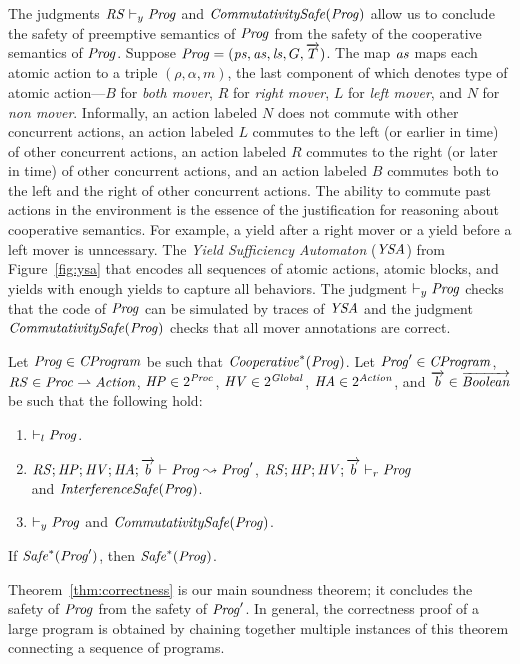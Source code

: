The judgments $\mathit{RS} \vdash_y \mathit{Prog}$ and $\mathit{CommutativitySafe}(\mathit{Prog})$
allow us to conclude the safety of preemptive semantics of $\mathit{Prog}$
from the safety of the cooperative semantics of $\mathit{Prog}$.
Suppose $\mathit{Prog} = (\mathit{ps}, \mathit{as}, \mathit{ls}, G, \overrightarrow{T})$.
The map $\mathit{as}$ maps each atomic action to a triple $(\rho, \alpha, m)$, the last component of which 
denotes type of atomic action---$B$ for {\em both mover}, $R$ for {\em right mover}, $L$ for {\em left mover},
and $N$ for {\em non mover}.
Informally, an action labeled $N$ does not commute with other concurrent actions,
an action labeled $L$ commutes to the left (or earlier in time) of other concurrent actions,
an action labeled $R$ commutes to the right (or later in time) of other concurrent actions,
and an action labeled $B$ commutes both to the left and the right of other concurrent actions.
The ability to commute past actions in the environment is the essence of the justification 
for reasoning about cooperative semantics.
For example, a yield after a right mover or a yield before a left mover is unncessary.
The {\em Yield Sufficiency Automaton\/} ($\mathit{YSA}$) from Figure~\ref{fig:ysa} that encodes 
all sequences of atomic actions, atomic blocks, and yields with enough yields to capture all behaviors.
The judgment $\vdash_y \mathit{Prog}$ checks that the code of $\mathit{Prog}$ can be simulated by traces of $\mathit{YSA}$
and the judgment $\mathit{CommutativitySafe}(\mathit{Prog})$ checks that all mover annotations are correct.

\begin{theorem}
\label{thm:correctness}
Let $\mathit{Prog} \in \mathit{CProgram}$ be such that $\mathit{Cooperative}^*(\mathit{Prog})$.
Let $\mathit{Prog}' \in \mathit{CProgram}$, $\mathit{RS} \in \mathit{Proc} \rightharpoonup \mathit{Action}$, $\mathit{HP} \in 2^{\mathit{Proc}}$, 
$\mathit{HV} \in 2^{\mathit{Global}}$, $\mathit{HA} \in 2^{\mathit{Action}}$,
and $\overrightarrow{b} \in \overrightarrow{\mathit{Boolean}}$ be such that the following hold:
\begin{enumerate}
\item
$\vdash_l \mathit{Prog}$.
\item
$\mathit{RS};\mathit{HP};\mathit{HV};\mathit{HA};\overrightarrow{b} \vdash \mathit{Prog} \leadsto \mathit{Prog}'$,
$\mathit{RS};\mathit{HP};\mathit{HV};\overrightarrow{b} \vdash_r \mathit{Prog}$ \\ and $\mathit{InterferenceSafe}(\mathit{Prog})$.
\item
$\vdash_y \mathit{Prog}$ and $\mathit{CommutativitySafe}(\mathit{Prog})$.
\end{enumerate}
If $\mathit{Safe}^*(\mathit{Prog}')$, then $\mathit{Safe}^*(\mathit{Prog})$.
\end{theorem}

Theorem~\ref{thm:correctness} is our main soundness theorem;
it concludes the safety of $\mathit{Prog}$ from the safety of $\mathit{Prog}'$.
In general, the correctness proof of a large program is obtained by chaining together
multiple instances of this theorem connecting a sequence of programs.  


